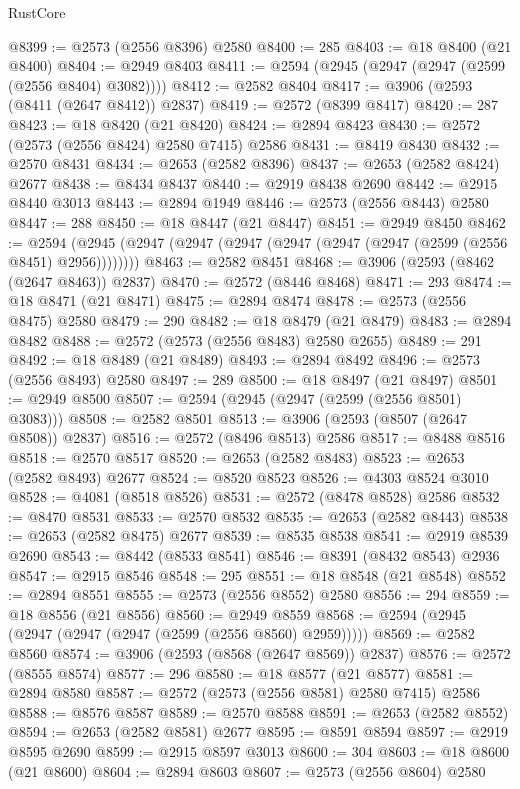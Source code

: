\begin{lexlean}{RustCore}
\begin{coremodule}
@8399 := @2573 (@2556 @8396) @2580
@8400 := 285
@8403 := @18 @8400 (@21 @8400)
@8404 := @2949 @8403
@8411 := @2594 (@2945 (@2947 (@2947 (@2599 (@2556 @8404) @3082))))
@8412 := @2582 @8404
@8417 := @3906 (@2593 (@8411 (@2647 @8412)) @2837)
@8419 := @2572 (@8399 @8417)
@8420 := 287
@8423 := @18 @8420 (@21 @8420)
@8424 := @2894 @8423
@8430 := @2572 (@2573 (@2556 @8424) @2580 @7415) @2586
@8431 := @8419 @8430
@8432 := @2570 @8431
@8434 := @2653 (@2582 @8396)
@8437 := @2653 (@2582 @8424) @2677
@8438 := @8434 @8437
@8440 := @2919 @8438 @2690
@8442 := @2915 @8440 @3013
@8443 := @2894 @1949
@8446 := @2573 (@2556 @8443) @2580
@8447 := 288
@8450 := @18 @8447 (@21 @8447)
@8451 := @2949 @8450
@8462 := @2594 (@2945 (@2947 (@2947 (@2947 (@2947 (@2947 (@2947 (@2599 (@2556 @8451) @2956))))))))
@8463 := @2582 @8451
@8468 := @3906 (@2593 (@8462 (@2647 @8463)) @2837)
@8470 := @2572 (@8446 @8468)
@8471 := 293
@8474 := @18 @8471 (@21 @8471)
@8475 := @2894 @8474
@8478 := @2573 (@2556 @8475) @2580
@8479 := 290
@8482 := @18 @8479 (@21 @8479)
@8483 := @2894 @8482
@8488 := @2572 (@2573 (@2556 @8483) @2580 @2655)
@8489 := 291
@8492 := @18 @8489 (@21 @8489)
@8493 := @2894 @8492
@8496 := @2573 (@2556 @8493) @2580
@8497 := 289
@8500 := @18 @8497 (@21 @8497)
@8501 := @2949 @8500
@8507 := @2594 (@2945 (@2947 (@2599 (@2556 @8501) @3083)))
@8508 := @2582 @8501
@8513 := @3906 (@2593 (@8507 (@2647 @8508)) @2837)
@8516 := @2572 (@8496 @8513) @2586
@8517 := @8488 @8516
@8518 := @2570 @8517
@8520 := @2653 (@2582 @8483)
@8523 := @2653 (@2582 @8493) @2677
@8524 := @8520 @8523
@8526 := @4303 @8524 @3010
@8528 := @4081 (@8518 @8526)
@8531 := @2572 (@8478 @8528) @2586
@8532 := @8470 @8531
@8533 := @2570 @8532
@8535 := @2653 (@2582 @8443)
@8538 := @2653 (@2582 @8475) @2677
@8539 := @8535 @8538
@8541 := @2919 @8539 @2690
@8543 := @8442 (@8533 @8541)
@8546 := @8391 (@8432 @8543) @2936
@8547 := @2915 @8546
@8548 := 295
@8551 := @18 @8548 (@21 @8548)
@8552 := @2894 @8551
@8555 := @2573 (@2556 @8552) @2580
@8556 := 294
@8559 := @18 @8556 (@21 @8556)
@8560 := @2949 @8559
@8568 := @2594 (@2945 (@2947 (@2947 (@2947 (@2599 (@2556 @8560) @2959)))))
@8569 := @2582 @8560
@8574 := @3906 (@2593 (@8568 (@2647 @8569)) @2837)
@8576 := @2572 (@8555 @8574)
@8577 := 296
@8580 := @18 @8577 (@21 @8577)
@8581 := @2894 @8580
@8587 := @2572 (@2573 (@2556 @8581) @2580 @7415) @2586
@8588 := @8576 @8587
@8589 := @2570 @8588
@8591 := @2653 (@2582 @8552)
@8594 := @2653 (@2582 @8581) @2677
@8595 := @8591 @8594
@8597 := @2919 @8595 @2690
@8599 := @2915 @8597 @3013
@8600 := 304
@8603 := @18 @8600 (@21 @8600)
@8604 := @2894 @8603
@8607 := @2573 (@2556 @8604) @2580

\end{coremodule}
\end{lexlean}
